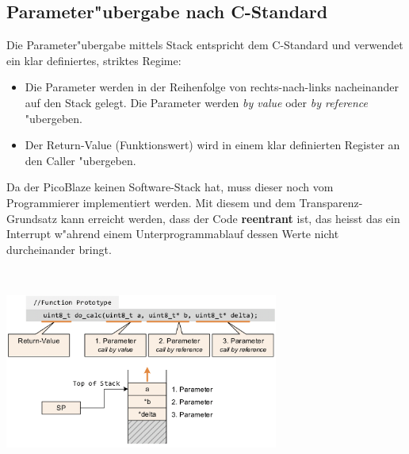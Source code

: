 \subsection{Parameter"ubergabe nach C-Standard}
\begin{minipage}{9cm}
	Die Parameter"ubergabe mittels Stack entspricht dem C-Standard und verwendet ein klar definiertes, striktes Regime:
\begin{itemize}
	\item Die Parameter werden in der Reihenfolge von rechts-nach-links nacheinander auf den Stack gelegt. Die Parameter werden \textit{by value} oder \textit{by reference} "ubergeben.
	\item Der Return-Value (Funktionswert) wird in einem klar definierten Register an den Caller "ubergeben.
\end{itemize}
Da der PicoBlaze keinen Software-Stack hat, muss dieser noch vom Programmierer implementiert werden. Mit diesem und dem Transparenz-Grundsatz kann erreicht werden, dass der Code \textbf{reentrant} ist, das heisst das ein Interrupt w"ahrend einem Unterprogrammablauf dessen Werte nicht durcheinander bringt.
\end{minipage}
%
\begin{minipage}{0.5cm}
	\ \
\end{minipage}
%
\begin{minipage}{9cm}
	\includegraphics[width=9cm]{pics/Function_C-Standard}
\end{minipage}
